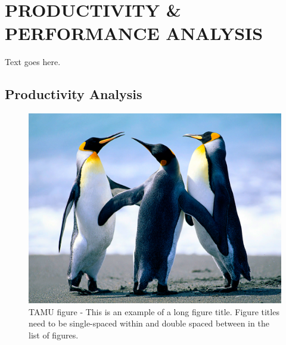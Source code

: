 %
%
%


\chapter{\uppercase {Productivity \& Performance Analysis}}

Text goes here.

\section{Productivity Analysis}
\begin{figure}[H]
\centering
\includegraphics[scale=.50]{figures/Penguins.jpg}
\caption{TAMU figure - This is an example of a long figure title.  Figure titles need to be single-spaced within and double spaced between in the list of figures.}
\label{fig:landscapepenguins}
\end{figure}
